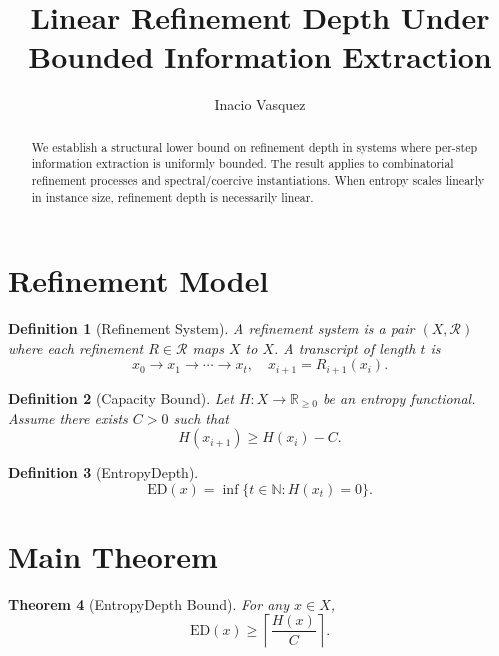 \documentclass[11pt]{article}
\title{Linear Refinement Depth Under Bounded Information Extraction}
\author{Inacio Vasquez}
\date{}
\newtheorem{theorem}{Theorem}
\newtheorem{definition}[theorem]{Definition}
\newcommand{\ED}{\mathrm{ED}}
\begin{document}
\maketitle

\begin{abstract}
We establish a structural lower bound on refinement depth in systems where per-step information extraction is uniformly bounded. The result applies to combinatorial refinement processes and spectral/coercive instantiations. When entropy scales linearly in instance size, refinement depth is necessarily linear.
\end{abstract}

\section{Refinement Model}

\begin{definition}[Refinement System]
A refinement system is a pair $(X,\mathcal{R})$ where each refinement $R\in\mathcal{R}$ maps $X$ to $X$. A transcript of length $t$ is
\[
x_0 \to x_1 \to \cdots \to x_t,
\quad x_{i+1}=R_{i+1}(x_i).
\]
\end{definition}

\begin{definition}[Capacity Bound

\noindent\textbf{Context note.}
The capacity bound on this page is an exposition-level organizing invariant for the textbook.
It should be read as the local transcript-capacity obstruction guiding later formal surfaces, not as an independent proof of any unrestricted theorem.
When a theorem-level statement is intended, the source of truth is the corresponding buildable formal repository artifact, including repository, commit or release, file path, theorem or artifact name, and status label.
]
Let $H:X\to\mathbb{R}_{\ge 0}$ be an entropy functional.  
Assume there exists $C>0$ such that
\[
H(x_{i+1}) \ge H(x_i) - C.
\]
\end{definition}

\begin{definition}[EntropyDepth]
\[
\ED(x) = \inf \{t \in \mathbb{N} : H(x_t)=0\}.
\]
\end{definition}

\section{Main Theorem}

\begin{theorem}[EntropyDepth Bound]
For any $x\in X$,
\[
\ED(x) \ge \left\lceil \frac{H(x)}{C} \right\rceil.
\]
\end{theorem}
\end{document}
